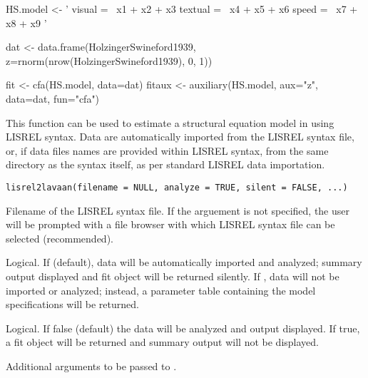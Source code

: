 \documentclass[a4paper]{book}
\begin{document}
%
\begin{Examples}
\begin{ExampleCode}
HS.model <- ' visual  =~ x1 + x2 + x3
              textual =~ x4 + x5 + x6
              speed   =~ x7 + x8 + x9 '
			  
dat <- data.frame(HolzingerSwineford1939, z=rnorm(nrow(HolzingerSwineford1939), 0, 1))
			  
fit <- cfa(HS.model, data=dat) 
fitaux <- auxiliary(HS.model, aux="z", data=dat, fun="cfa")
\end{ExampleCode}
\end{Examples}
%
\begin{Description}\relax
This function can be used to estimate a structural equation model in  using LISREL syntax. Data are automatically imported from the LISREL syntax file, or, if data files names are provided within LISREL syntax, from the same directory as the syntax itself, as per standard LISREL data importation. 
\end{Description}
%
\begin{Usage}
\begin{verbatim}
lisrel2lavaan(filename = NULL, analyze = TRUE, silent = FALSE, ...)
\end{verbatim}
\end{Usage}
%
\begin{Arguments}
\begin{ldescription}
\item[\code{filename}] 
Filename of the LISREL syntax file. If the  arguement is not specified, the user will be prompted with a file browser with which LISREL syntax file can be selected (recommended). 

\item[\code{analyze}] 
Logical. If  (default), data will be automatically imported and analyzed;  summary output displayed and fit object will be returned silently. If , data will not be imported or analyzed; instead, a  parameter table containing the model specifications will be returned. 

\item[\code{silent}] 
Logical. If false (default) the data will be analyzed and output displayed. If true, a fit object will be returned and summary output will not be displayed. 

\item[\code{...}]  
Additional arguments to be passed to .

\end{ldescription}
\end{Arguments}
\end{document}
